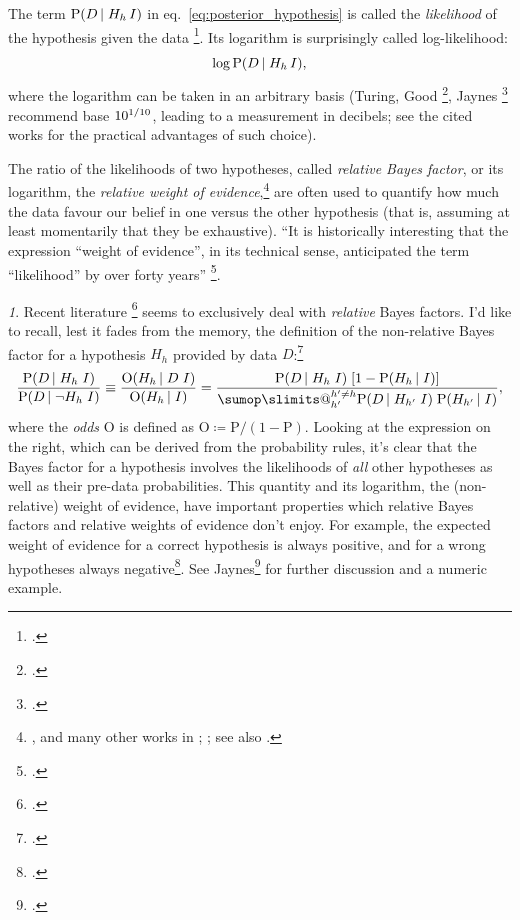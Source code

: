 \documentclass[\ifafour a4paper,12pt,\else a5paper,10pt,\fi%
onecolumn,oneside,article,%
british%
]{memoir}
\makeatletter
\theoremstyle{remark}
\theoremstyle{innote}
\newtheorem*{innote}{}
\def\sum{\DOTSI\sumop\slimits@}
\newcommand*{\citep}{\footcites}
\newcommand*{\citey}{\footcites}%
\newcommand*{\defd}{\coloneqq}
\newcommand*{\p}{\mathrm{P}}%
\renewcommand*{\|}[1][]{\nonscript\,#1\vert\nonscript\;\mathopen{}}
\newcommand*{\sect}{\S}%
\newcommand*{\sects}{\S\S}%
\newcommand*{\chap}{ch.}%
\newcommand*{\chaps}{chs}%
\newcommand*{\eqn}{eq.}%
\newcommand*{\eg}{{e.g.}}
\newcommand*{\yK}{I}
\newcommand*{\yO}{\mathrm{O}}
\makeatother
\begin{document}
\bigskip

The term $\p(D \| H_{h} \, \yK)$ in \eqn~\eqref{eq:posterior_hypothesis} is
called the \emph{likelihood} of the hypothesis given the data
\citep[\sect~6.1 p.~62]{good1950}. Its logarithm is surprisingly called
log-likelihood:
\begin{equation}
  \label{eq:log-likelihood}
  \log\p(D \| H_{h} \, \yK),
\end{equation}
where the logarithm can be taken in an arbitrary basis (Turing, Good
\citep[\eg][]{good1985,good1950,good1969}, Jaynes
\citep[\sect~4.2]{jaynes1994_r2003} recommend base
$\cramped10^{1/10}$, leading to a measurement in decibels; see the
cited works for the practical advantages of such choice).

The ratio of the likelihoods of two hypotheses, called \emph{relative Bayes
  factor}, or its logarithm, the \emph{relative weight of
  evidence},\footnote{\cites[\chap~6]{good1950}{good1975,good1981,good1985},
  and many other works in \cite{good1983};
  \cites[\sect~1.4]{osteyeeetal1974}{mackay1992,kassetal1995}; see also
  \cite[\chaps~V, VI, A]{jeffreys1939_r1983}.} are often used to quantify
how much the data favour our belief in one versus the other
hypothesis (that is, assuming at least momentarily that they be
exhaustive). \enquote{It is historically interesting that the expression
  ``weight of evidence'', in its technical sense, anticipated the term
  ``likelihood'' by over forty years} \citep[\sect~1.4.2
p.~12]{osteyeeetal1974}.
\begin{innote}
  Recent literature \citep[for example][]{kassetal1995} seems to
  exclusively deal with \emph{relative} Bayes factors. I'd like to recall,
  lest it fades from the memory, the definition of the non-relative Bayes
  factor for a hypothesis $H_{h}$ provided by data
  $D$:\citep[\sect~2]{good1981}
  \begin{equation}
    \label{eq:proper_Bayes_factor}
    \frac{\p(D \| H_{h} \; \yK)}{\p(D \| \lnot H_{h} \; \yK)} \equiv
    \frac{\yO(H_{h} \| D \; \yK)}{\yO(H_{h} \| \yK)} =
    \frac{\p(D \| H_{h}\; \yK)\; [1- \p(H_{h} \| \yK)]}{
\sum_{h'}^{h' \ne h} \p(D \| H_{h'} \; \yK) \; \p(H_{h'} \| \yK)
    },
  \end{equation}
  where the \emph{odds} $\yO$ is defined as $\yO \defd \p/(1-\p)$. Looking
  at the expression on the right, which can be derived from the probability
  rules, it's clear that the Bayes factor for a hypothesis involves the
  likelihoods of \emph{all} other hypotheses as well as their pre-data
  probabilities. This quantity and its logarithm, the (non-relative) weight
  of evidence, have important properties which relative Bayes factors and
  relative weights of evidence don't enjoy. For example, the expected
  weight of evidence for a correct hypothesis is always positive, and for a
  wrong hypotheses always negative\citep[\sect~6.7]{good1950}. See
  Jaynes\citey[\sects~4.3--4.4]{jaynes1994_r2003} for further discussion
  and a numeric example.
\end{innote}
\end{document}

